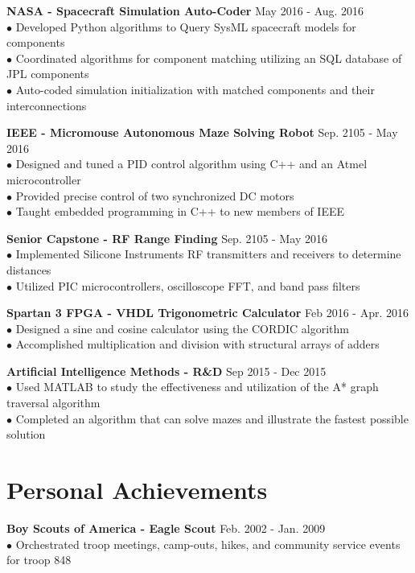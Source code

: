 \documentclass[margin,line]{res}
\begin{document}
\begin{resume}
{\bf NASA - Spacecraft Simulation Auto-Coder}
\hfill{May 2016 - Aug. 2016}\\
$\bullet$ Developed Python algorithms to Query SysML spacecraft models for components \\
$\bullet$ Coordinated algorithms for component matching utilizing an SQL database of JPL components \\
$\bullet$ Auto-coded simulation initialization with matched components and their interconnections 

{\bf IEEE - Micromouse Autonomous Maze Solving Robot}
\hfill{Sep. 2105 - May 2016}\\
$\bullet$ Designed and tuned a PID control algorithm using C++ and an Atmel microcontroller \\
$\bullet$ Provided precise control of two synchronized DC motors \\
$\bullet$ Taught embedded programming in C++ to new members of IEEE


{\bf Senior Capstone - RF Range Finding}
\hfill{Sep. 2105 - May 2016}\\
$\bullet$ Implemented Silicone Instruments RF transmitters and receivers to determine distances \\
$\bullet$ Utilized PIC microcontrollers, oscilloscope FFT, and band pass filters 


{\bf Spartan 3 FPGA - VHDL Trigonometric Calculator }
\hfill{Feb 2016 - Apr. 2016}\\
$\bullet$ Designed a sine and cosine calculator using the CORDIC algorithm \\
$\bullet$ Accomplished multiplication and division with structural arrays of adders

{\bf Artificial Intelligence Methods - R\&D}
\hfill{Sep 2015 - Dec 2015}\\
$\bullet$ Used MATLAB to study the effectiveness and utilization of the A* graph traversal algorithm \\
$\bullet$ Completed an algorithm that can solve mazes and illustrate the fastest possible solution

\section{\sc Personal Achievements}
{\bf Boy Scouts of America - Eagle Scout}
\hfill{Feb. 2002 - Jan. 2009}\\
$\bullet$ Orchestrated troop meetings, camp-outs, hikes, and community service events for troop 848


\end{resume}
\end{document}
